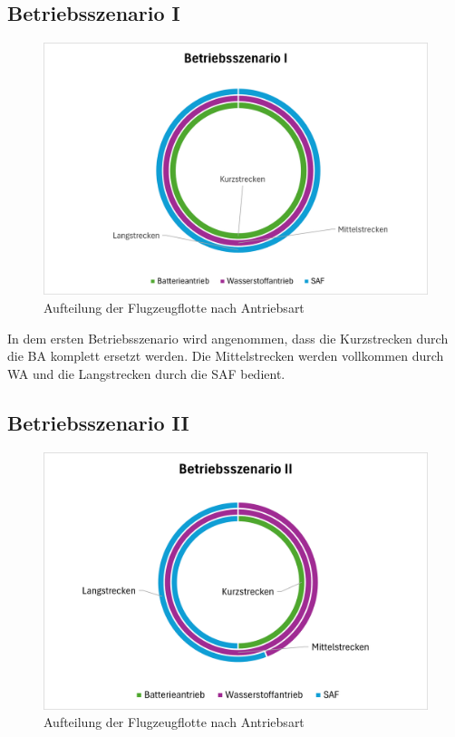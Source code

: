 \subsection{Betriebsszenario I}

\begin{figure}[h]
	\centering
	\includegraphics[width=0.8\linewidth]{Bilder/BetriebsszenarioI.png}
	\caption[Betriebsszenario I]{Aufteilung der Flugzeugflotte nach Antriebsart}
	\label{betriebsszenario1}
\end{figure}

In dem ersten Betriebsszenario wird angenommen, dass die Kurzstrecken durch die BA komplett ersetzt werden.
Die Mittelstrecken werden vollkommen durch WA und die Langstrecken durch die SAF bedient.

\subsection{Betriebsszenario II}

\begin{figure}[h]
	\centering
	\includegraphics[width=0.8\linewidth]{Bilder/BetriebsszenarioII.png}
	\caption[Betriebsszenario II]{Aufteilung der Flugzeugflotte nach Antriebsart}
	\label{betriebsszenario2}
\end{figure}

